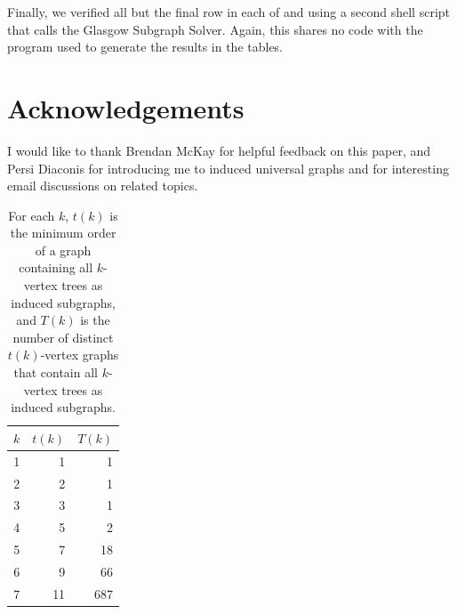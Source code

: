 \documentclass[12pt]{article}
\begin{document}
Finally, we verified all but the final row in each of 
and  using a second shell script that calls the Glasgow
Subgraph Solver.  Again, this shares no code with the program used to generate
the results in the tables.

\section{Acknowledgements}

I would like to thank Brendan McKay for helpful feedback on this paper, and Persi
Diaconis for introducing me to induced universal graphs and for interesting email
discussions on related topics.

\begin{table}[h!]
\centering
\begin{tabular}{r r r}
 \toprule
 $k$ & $t(k)$ & $T(k)$ \\ [0.5ex]
 \midrule
 1 & 1 & 1 \\
 2 & 2 & 1 \\
 3 & 3 & 1 \\
 4 & 5 & 2 \\
 5 & 7 & 18 \\
 6 & 9 & 66 \\
 7 & 11 & 687 \\
 \bottomrule
\end{tabular}
\caption{For each $k$, $t(k)$ is the minimum order of a graph containing all $k$-vertex trees as
induced subgraphs, and $T(k)$ is the number of distinct $t(k)$-vertex graphs that contain
all $k$-vertex trees as induced subgraphs.}
\label{tab:treeresults}
\end{table}
\end{document}
